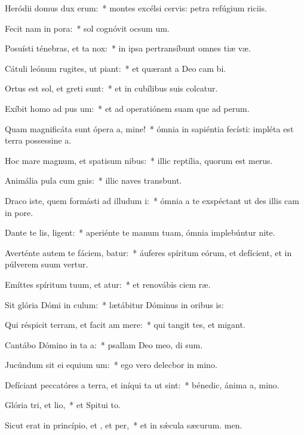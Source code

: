 \item Heródii domus dux  erum:~* montes excélsi cervis: petra refúgium riciis.
\item Fecit nam in pora:~* sol cognóvit ocsum um.
\item Posuísti ténebras, et ta  nox:~* in ipsa pertransíbunt omnes tiæ væ.
\item Cátuli leónum rugites, ut piant:~* et quærant a Deo cam bi.
\item Ortus est sol, et greti sunt:~* et in cubílibus suis colcatur.
\item Exíbit homo ad pus um:~* et ad operatiónem suam que ad perum.
\item Quam magnificáta sunt ópera a, mine!~* ómnia in sapiéntia fecísti: impléta est terra possessine a.
\item Hoc mare magnum, et spatisum nibus:~* illic reptília, quorum  est merus.
\item Animália pula cum gnis:~* illic naves transbunt.
\item Draco iste, quem formásti ad illudum i:~* ómnia a te exspéctant ut des illis cam in pore.
\item Dante te lis, ligent:~* aperiénte te manum tuam, ómnia implebúntur nite.
\item Averténte autem te fáciem, batur:~* áuferes spíritum eórum, et defícient, et in púlverem suum vertur.
\item Emíttes spíritum tuum, et atur:~* et renovábis ciem ræ.
\item Sit glória Dómi in culum:~* lætábitur Dóminus in oribus is:
\item Qui réspicit terram, et facit am mere:~* qui tangit tes, et migant.
\item Cantábo Dómino in ta a:~* psallam Deo meo, di sum.
\item Jucúndum sit ei equium um:~* ego vero delecbor in mino.
\item Defíciant peccatóres a terra, et iníqui ta ut  sint:~* bénedic, ánima a, mino.
\item Glória tri, et lio,~* et Spitui to.
\item Sicut erat in princípio, et , et per,~* et in sǽcula sæcurum. men.
